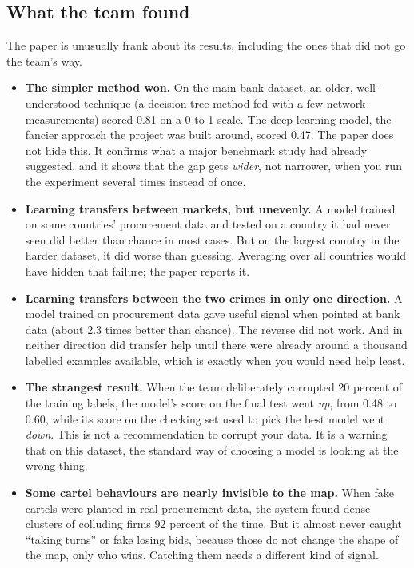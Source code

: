 \documentclass[11pt,a4paper]{article}
\begin{document}
\subsection{What the team found}

The paper is unusually frank about its results, including the ones that did not
go the team's way.

\begin{itemize}
\item \textbf{The simpler method won.} On the main bank dataset, an
      older, well-understood technique (a decision-tree method fed with a few
      network measurements) scored 0.81 on a 0-to-1 scale. The deep learning
      model, the fancier approach the project was built around, scored 0.47.
      The paper does not hide this. It confirms what a major benchmark study
      had already suggested, and it shows that the gap gets \emph{wider}, not
      narrower, when you run the experiment several times instead of once.

\item \textbf{Learning transfers between markets, but unevenly.} A model
      trained on some countries' procurement data and tested on a country it
      had never seen did better than chance in most cases. But on the largest
      country in the harder dataset, it did worse than guessing. Averaging over
      all countries would have hidden that failure; the paper reports it.

\item \textbf{Learning transfers between the two crimes in only one
      direction.} A model trained on procurement data gave useful signal when
      pointed at bank data (about 2.3 times better than chance). The reverse did
      not work. And in neither direction did transfer help until there were
      already around a thousand labelled examples available, which is exactly
      when you would need help least.

\item \textbf{The strangest result.} When the team deliberately corrupted 20
      percent of the training labels, the model's score on the final test went
      \emph{up}, from 0.48 to 0.60, while its score on the checking set used to
      pick the best model went \emph{down}. This is not a recommendation to
      corrupt your data. It is a warning that on this dataset, the standard way
      of choosing a model is looking at the wrong thing.

\item \textbf{Some cartel behaviours are nearly invisible to the map.} When
      fake cartels were planted in real procurement data, the system found
      dense clusters of colluding firms 92 percent of the time. But it almost
      never caught ``taking turns'' or fake losing bids, because those do not
      change the shape of the map, only who wins. Catching them needs a
      different kind of signal.


\end{itemize}
\end{document}
